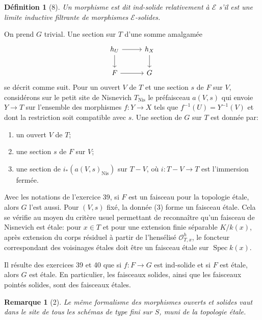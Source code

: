 \documentclass[11pt]{article}
\newcommand{\Nis}{\mathrm{Nis}}
\newcommand{\Spec}{\operatorname{Spec}}
\theoremstyle{deligne}
\newtheorem*{definition*}{Définition}
\newtheorem*{remark*}{Remarque}
\newcommand{\heading}[1]{\vspace{0.7em}\noindent{\bfseries #1}\quad}
\begin{document}
\begin{definition*}[8]
Un morphisme est dit ind-solide relativement à \(\mathcal E\) s'il est une limite inductive filtrante de morphismes \(\mathcal E\)-solides.
\end{definition*}

\heading{Exercice 39.}
On prend \(G\) trivial. Une section sur \(T\) d'une somme amalgamée
\[
\begin{tikzcd}[column sep=2.8em,row sep=1.8em]
h_U \arrow[r] \arrow[d] & h_X \arrow[d]\\
F \arrow[r] & G
\end{tikzcd}
\]
se décrit comme suit. Pour un ouvert \(V\) de \(T\) et une section \(s\) de \(F\) sur \(V\), considérons sur le petit site de Nisnevich \(T_{\Nis}\) le préfaisceau \(a(V,s)\) qui envoie \(Y\to T\) sur l'ensemble des morphismes \(f:Y\to X\) tels que \(f^{-1}(U)=Y^{-1}(V)\) et dont la restriction soit compatible avec \(s\). Une section de \(G\) sur \(T\) est donnée par:
\begin{enumerate}[label=\arabic*.]
\item un ouvert \(V\) de \(T\);
\item une section \(s\) de \(F\) sur \(V\);
\item une section de \(i_*(a(V,s)_{\Nis})\) sur \(T-V\), où \(i:T-V\to T\) est l'immersion fermée.
\end{enumerate}

\heading{Exercice 40.}
Avec les notations de l'exercice 39, si \(F\) est un faisceau pour la topologie étale, alors \(G\) l'est aussi. Pour \((V,s)\) fixé, la donnée (3) forme un faisceau étale. Cela se vérifie au moyen du critère usuel permettant de reconnaître qu'un faisceau de Nisnevich est étale: pour \(x\in T\) et pour une extension finie séparable \(K/k(x)\), après extension du corps résiduel à partir de l'hensélisé \(\mathcal O^h_{T,x}\), le foncteur correspondant des voisinages étales doit être un faisceau étale sur \(\Spec k(x)\).

\heading{Exercice 41.}
Il résulte des exercices 39 et 40 que si \(f:F\to G\) est ind-solide et si \(F\) est étale, alors \(G\) est étale. En particulier, les faisceaux solides, ainsi que les faisceaux pointés solides, sont des faisceaux étales.

\begin{remark*}[2]
Le même formalisme des morphismes ouverts et solides vaut dans le site de tous les schémas de type fini sur \(S\), muni de la topologie étale.
\end{remark*}
\end{document}
